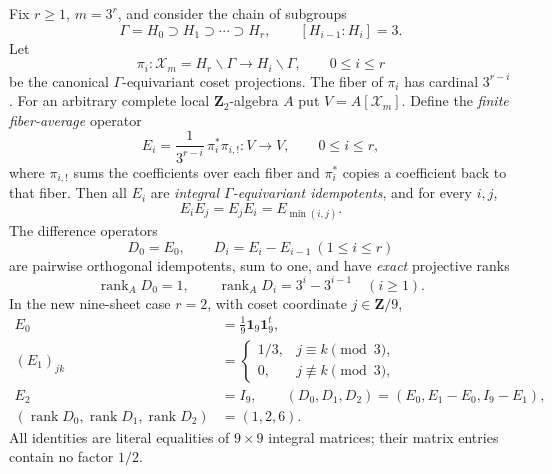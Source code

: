 \begin{theorem}
\label{thm:dyadic-f135-nested-hecke-flags}
Fix $r\ge1$,
$m=3^r$,
and consider
the chain of
subgroups
\[
\Gamma=H_0\supset
H_1\supset\cdots\supset H_r,
\qquad
[H_{i-1}:H_i]=3.
\]
Let
\[
\pi_i:
\mathscr X_m=H_r\backslash\Gamma
\longrightarrow
H_i\backslash\Gamma,
\qquad
0\le i\le r
\]
be the
canonical
$\Gamma$-equivariant
coset projections.
The fiber
of $\pi_i$
has cardinal
$3^{r-i}$.
For an arbitrary
complete local
$\mathbf Z_2$-algebra
$A$ put
$V=A[\mathscr X_m]$.
Define the
\emph{finite
fiber-average}
operator
\begin{equation}\label{eq:dyadic-f135-flag-fiber-averages}
\boxed{\quad
E_i=
\frac1{3^{r-i}}
\,\pi_i^*\pi_{i,!}:
V\longrightarrow V,
\qquad 0\le i\le r,
\quad}
\end{equation}
where $\pi_{i,!}$
sums the
coefficients
over each
fiber and
$\pi_i^*$
copies a
coefficient
back to
that fiber.
Then all $E_i$
are
\emph{integral
$\Gamma$-equivariant
idempotents}, and
for every
$i,j$,
\begin{equation}\label{eq:dyadic-f135-strict-flag-composition}
\boxed{\qquad
E_iE_j=E_jE_i
=E_{\min(i,j)}.
\qquad}
\end{equation}
The difference
operators
\begin{equation}\label{eq:dyadic-f135-flag-primitive-layers}
\boxed{
D_0=E_0,\qquad
D_i=E_i-E_{i-1}
\ (1\le i\le r)
}
\end{equation}
are pairwise
orthogonal
idempotents,
sum to one,
and have
\emph{exact}
projective
ranks
\begin{equation}\label{eq:dyadic-f135-flag-layer-ranks}
\boxed{\qquad
\operatorname{rank}_A D_0=1,
\qquad
\operatorname{rank}_A D_i
=3^i-3^{i-1}
\quad(i\ge1).
\qquad}
\end{equation}
In the
new nine-sheet
case $r=2$,
with coset
coordinate
$j\in\mathbf Z/9$,
\begin{equation}\label{eq:dyadic-f135-nine-explicit-flag}
\boxed{
\begin{aligned}
E_0&=\tfrac19
\mathbf1_9\mathbf1_9^t,\\
(E_1)_{jk}
&=\begin{cases}
1/3,&j\equiv k\pmod3,\\
0,&j\not\equiv k\pmod3,
\end{cases}\\
E_2&=I_9,\qquad
(D_0,D_1,D_2)
=(E_0,E_1-E_0,I_9-E_1),\\
(\operatorname{rank}D_0,
\operatorname{rank}D_1,
\operatorname{rank}D_2)
&=(1,2,6).
\end{aligned}}
\end{equation}
All identities
are literal
equalities of
$9\times9$
integral matrices;
their matrix
entries contain
no factor $1/2$.


\end{theorem}
